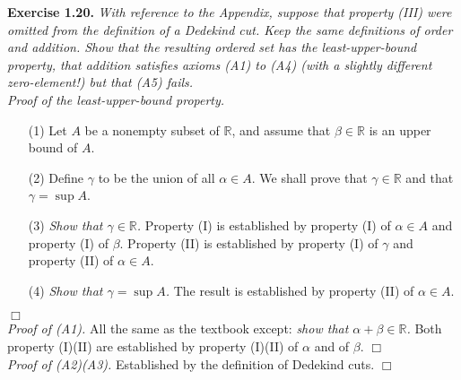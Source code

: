 \documentclass{article}
\begin{document}



\textbf{Exercise 1.20.}
\emph{With reference to the Appendix,
suppose that property (III) were omitted from the definition of a Dedekind cut.
Keep the same definitions of order and addition.
Show that the resulting ordered set has the least-upper-bound property,
that addition satisfies axioms (A1) to (A4) (with a slightly different zero-element!)
but that (A5) fails. } \\

\emph{Proof of the least-upper-bound property.}
\begin{enumerate}
\item[(1)]
Let $A$ be a nonempty subset of $\mathbb{R}$,
and assume that $\beta \in \mathbb{R}$ is an upper bound of $A$.
\item[(2)]
Define $\gamma$ to be the union of all $\alpha \in A$.
We shall prove that $\gamma \in \mathbb{R}$ and that $\gamma = \sup A$.
\item[(3)]
\emph{Show that $\gamma \in \mathbb{R}$.}
Property (I) is established by property (I) of $\alpha \in A$ and property (I) of $\beta$.
Property (II) is established by property (I) of $\gamma$ and property (II) of $\alpha \in A$.
\item[(4)]
\emph{Show that $\gamma = \sup A$.}
The result is established by property (II) of $\alpha \in A$.
\end{enumerate}
$\Box$ \\

\emph{Proof of (A1).}
All the same as the textbook except:
\emph{show that $\alpha+\beta \in \mathbb{R}$.}
Both property (I)(II) are established by property (I)(II) of $\alpha$ and of $\beta$.
$\Box$ \\

\emph{Proof of (A2)(A3).}
Established by the definition of Dedekind cuts.
$\Box$ \\
\end{document}
